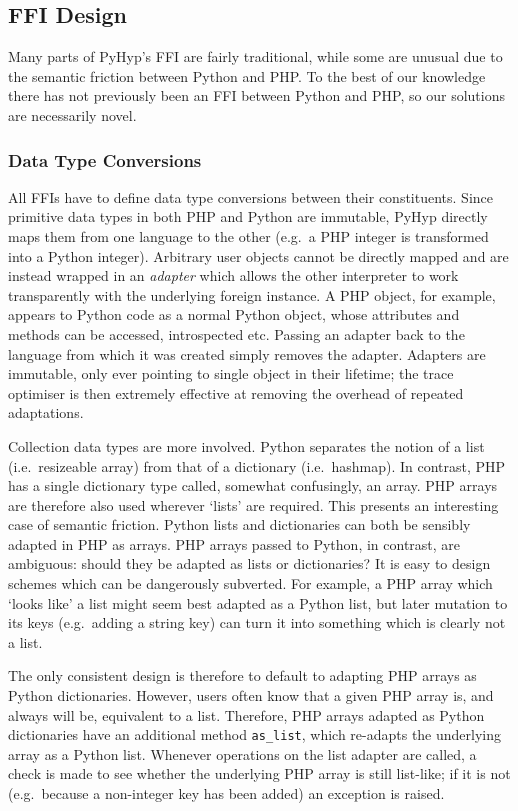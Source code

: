 \documentclass[a4paper,UKenglish]{lipics-v2016}
\newcommand{\ourvm}{PyHyp\xspace}
\begin{document}
\subsection{FFI Design}

Many parts of \ourvm's FFI are fairly traditional, while some are unusual due to
the semantic friction between Python and PHP. To the best of our knowledge there
has not previously been an FFI between Python and PHP, so our solutions are
necessarily novel.


\subsubsection{Data Type Conversions}
\label{sec:designconversions}

All FFIs have to define data type conversions between their constituents.
Since primitive data types in both PHP and Python are immutable, \ourvm
directly maps them from one language to the other (e.g.~a PHP integer is transformed
into a Python integer). Arbitrary user objects cannot be directly mapped and are
instead wrapped in
an \emph{adapter} which allows the other interpreter to work transparently
with the underlying foreign instance. A PHP object, for
example, appears to Python code as a normal Python object, whose attributes
and methods can be accessed, introspected etc. Passing an
adapter back to the language from which it was created simply removes
the adapter. Adapters are immutable, only ever pointing to single
object in their lifetime; the trace optimiser is then extremely
effective at removing the overhead of repeated adaptations.

Collection data types are more involved. Python separates the notion of a list
(i.e.~resizeable array) from that of a dictionary (i.e.~hashmap).
In contrast, PHP has a single dictionary type called, somewhat confusingly, an
array. PHP arrays are therefore also used wherever `lists' are required. This
presents an interesting case of semantic friction. Python lists
and dictionaries can both be sensibly adapted in PHP as arrays. PHP arrays
passed to Python, in contrast, are ambiguous: should they be adapted as
lists or dictionaries? It is easy to design schemes which can be dangerously
subverted. For example, a PHP array which `looks like' a list might seem best
adapted as a Python list, but later mutation to its keys (e.g.~adding a
string key) can turn it into something which is clearly not a list.

The only consistent
design is therefore to default to adapting PHP arrays as Python dictionaries.
However, users often know that a given PHP array is, and always will be,
equivalent to a list. Therefore, PHP arrays adapted as Python dictionaries
have an additional method \texttt{as\_list}, which re-adapts
the underlying array as a Python list. Whenever operations on
the list adapter are called, a check is made to see whether the underlying PHP array is
still list-like; if it is not (e.g.~because a non-integer key has been added) an
exception is raised.
\end{document}

